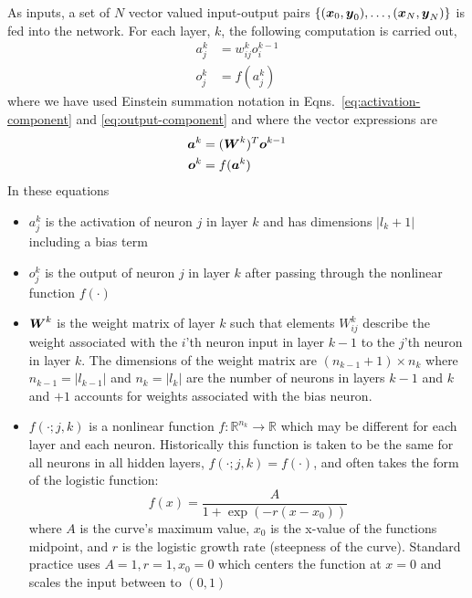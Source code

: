 \documentclass[12pt,notitlepage]{article}
\begin{document}
As inputs, a set of $N$ vector valued input-output pairs $\{(\boldsymbol{x}_{0},\boldsymbol{y}_{0}), \dots,
(\boldsymbol{x}_{N},\boldsymbol{y}_{N})\}$ is fed into the network.  For each layer, $k$, the
following computation is carried out,
\begin{align}
  \label{eq:activation-component}
  a_{j}^{k} &= w_{ij}^{k}o_{i}^{k-1}\\
  \label{eq:output-component}
  o_{j}^{k} &= f( a_{j}^{k})  
\end{align}
where we have used Einstein summation notation in
Eqns.~\ref{eq:activation-component} and \ref{eq:output-component} and
where the vector expressions are
\begin{align}
  \label{eq:activation-matrix}
  \boldsymbol{a}^{k} &= (\boldsymbol{W}^{k})^{T}\boldsymbol{o}^{k-1}\\
  \label{eq:output-matrix}
  \boldsymbol{o}^{k} &= f(\boldsymbol{a}^{k})
\end{align}
In these equations
\begin{itemize}
\item $a_{j}^{k}$ is the activation of neuron $j$ in layer $k$ and has
  dimensions $|l_{k}+1|$ including a bias term
\item $o_{j}^{k}$ is the output of neuron $j$ in layer $k$ after
  passing through the nonlinear function $f(\cdot)$
\item $\boldsymbol{W}^{k}$ is the weight matrix of layer $k$ such that
  elements $W_{ij}^{k}$ describe the weight associated with the $i$'th
  neuron input in layer $k-1$ to the $j$'th neuron in layer $k$.
  The dimensions of the weight matrix are $( n_{k-1} + 1 ) \times
  n_{k}$ where $n_{k-1} = |l_{k-1}|$ and $n_{k}
  = |l_{k}|$ are the number of neurons in layers $k-1$ and $k$ and
  $+1$ accounts for weights associated with the bias neuron.
\item $f(\cdot;j,k)$ is a nonlinear function $f: \mathbb{R}^{n_{k}} \to
  \mathbb{R}$ which may be different for each layer and each neuron.  Historically
  this function is taken to be the same for all neurons in all hidden
  layers,
  $f( \cdot; j,k ) = f( \cdot )$, and often takes the form of the
  logistic function:
  \begin{equation}
    \label{eq:logistic-fun}
    f(x) = \frac{A}{1+\exp(-r(x-x_{0}))}
  \end{equation}
  where $A$ is the curve's maximum value, $x_{0}$ is the x-value of
  the functions midpoint, and $r$ is the logistic growth rate
  (steepness of the curve).  Standard practice uses $A=1, r=1, x_{0} =
  0$ which centers the function at $x=0$ and scales the input between
  to $(0,1)$
\end{itemize}
\end{document}
